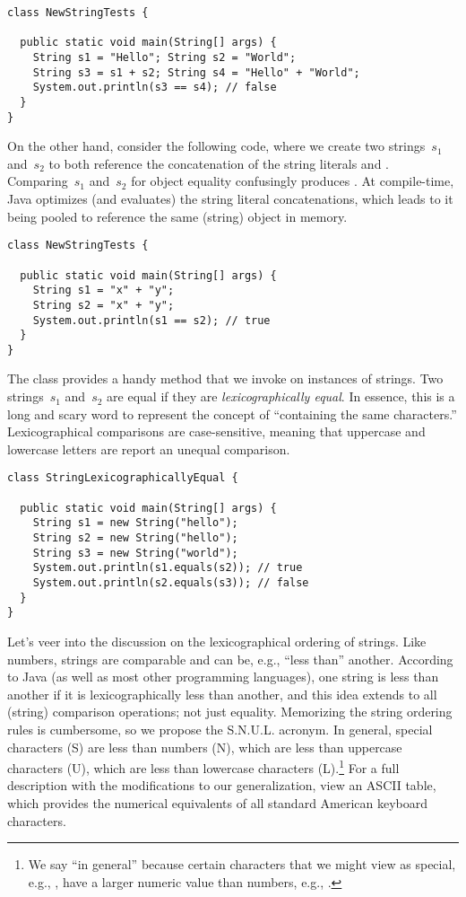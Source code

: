 \begin{lstlisting}[language=MyJava]
class NewStringTests {

  public static void main(String[] args) {
    String s1 = "Hello"; String s2 = "World";
    String s3 = s1 + s2; String s4 = "Hello" + "World";
    System.out.println(s3 == s4); // false
  }
}
\end{lstlisting}

On the other hand, consider the following code, where we create two strings~$s_1$ and~$s_2$ to both reference the concatenation of the string literals  and . 
Comparing~$s_1$ and~$s_2$ for object equality confusingly produces .
At compile-time, Java optimizes (and evaluates) the string literal concatenations, which leads to it being pooled to reference the same (string) object in memory.

\begin{lstlisting}[language=MyJava]
class NewStringTests {

  public static void main(String[] args) {
    String s1 = "x" + "y";
    String s2 = "x" + "y";
    System.out.println(s1 == s2); // true
  }
}
\end{lstlisting}

The  class provides a handy  method that we invoke on instances of strings. 
Two strings~$s_1$ and~$s_2$ are equal if they are \emph{lexicographically equal}. 
In essence, this is a long and scary word to represent the concept of ``containing the same characters.'' 
Lexicographical comparisons are case-sensitive, meaning that uppercase and lowercase letters are report an unequal comparison.

\begin{lstlisting}[language=MyJava]
class StringLexicographicallyEqual {

  public static void main(String[] args) {
    String s1 = new String("hello");
    String s2 = new String("hello");
    String s3 = new String("world");
    System.out.println(s1.equals(s2)); // true
    System.out.println(s2.equals(s3)); // false
  }
}
\end{lstlisting}

Let's veer into the discussion on the lexicographical ordering of strings. 
Like numbers, strings are comparable and can be, e.g., ``less than'' another. 
According to Java (as well as most other programming languages), one string is less than another if it is lexicographically less than another, and this idea extends to all (string) comparison operations; not just equality. 
Memorizing the string ordering rules is cumbersome, so we propose the S.N.U.L. acronym. 
In general, special characters (S) are less than numbers (N), which are less than uppercase characters (U), which are less than lowercase characters (L).\footnote{We say ``in general'' because certain characters that we might view as special, e.g., , have a larger numeric value than numbers, e.g., \ttt{\q{}2\q{}}.} 
For a full description with the modifications to our generalization, view an ASCII table, which provides the numerical equivalents of all standard American keyboard characters. 

